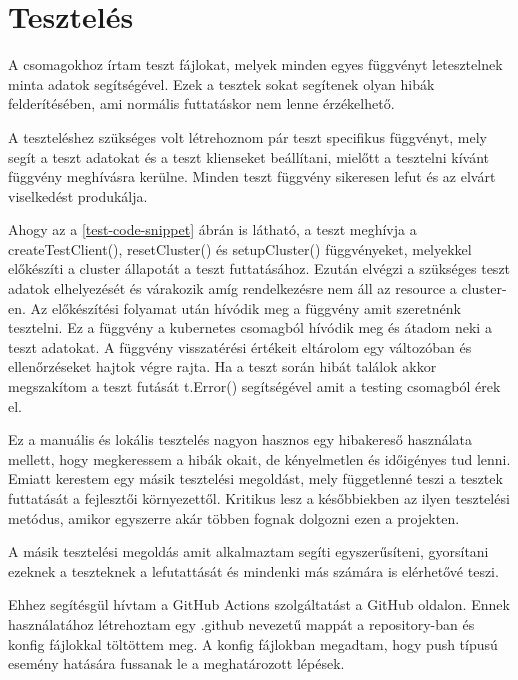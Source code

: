 \section{Tesztelés}
A csomagokhoz írtam teszt fájlokat, melyek minden egyes függvényt letesztelnek minta adatok segítségével.
Ezek a tesztek sokat segítenek olyan hibák felderítésében, ami normális futtatáskor nem lenne érzékelhető.

A teszteléshez szükséges volt létrehoznom pár teszt specifikus függvényt, mely segít a teszt adatokat és a teszt klienseket beállítani, mielőtt a tesztelni kívánt függvény meghívásra kerülne. Minden teszt függvény sikeresen lefut és az elvárt viselkedést produkálja.

Ahogy az a \ref{test-code-snippet} ábrán is látható, a teszt meghívja a createTestClient(), resetCluster() és setupCluster() függvényeket, melyekkel előkészíti a cluster állapotát a teszt futtatásához.
Ezután elvégzi a szükséges teszt adatok elhelyezését és várakozik amíg rendelkezésre nem áll az resource a cluster-en.
Az előkészítési folyamat után hívódik meg a függvény amit szeretnénk tesztelni.
Ez a függvény a kubernetes csomagból hívódik meg és átadom neki a teszt adatokat.
A függvény visszatérési értékeit eltárolom egy változóban és ellenőrzéseket hajtok végre rajta.
Ha a teszt során hibát találok akkor megszakítom a teszt futását t.Error() segítségével amit a testing csomagból érek el.

Ez a manuális és lokális tesztelés nagyon hasznos egy hibakereső használata mellett, hogy megkeressem a hibák okait, de kényelmetlen és időigényes tud lenni.
Emiatt kerestem egy másik tesztelési megoldást, mely függetlenné teszi a tesztek futtatását a fejlesztői környezettől.
Kritikus lesz a későbbiekben az ilyen tesztelési metódus, amikor egyszerre akár többen fognak dolgozni ezen a projekten.

A másik tesztelési megoldás amit alkalmaztam segíti egyszerűsíteni, gyorsítani ezeknek a teszteknek a lefutattását és mindenki más számára is elérhetővé teszi. 

Ehhez segítésgül hívtam a GitHub Actions szolgáltatást a GitHub oldalon.
Ennek használatához létrehoztam egy .github nevezetű mappát a repository-ban és konfig fájlokkal töltöttem meg.
A konfig fájlokban megadtam, hogy push típusú esemény hatására fussanak le a meghatározott lépések.

